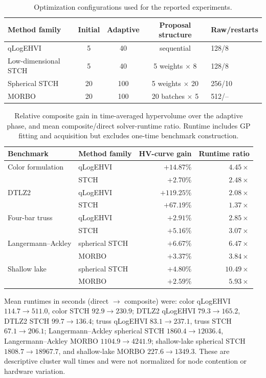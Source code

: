 \documentclass{article}
\begin{document}
\begin{table}[ht]
\centering
\caption{Optimization configurations used for the reported experiments.}
\label{tab:optimization-config}
\footnotesize
\setlength{\tabcolsep}{4pt}
\begin{tabular}{lcccl}
\toprule
Method family & Initial & Adaptive & Proposal structure & Raw/restarts \\
\midrule
qLogEHVI & 5 & 40 & sequential & 128/8 \\
Low-dimensional STCH & 5 & 40 & 5 weights $\times$ 8 & 128/8 \\
Spherical STCH & 20 & 100 & 5 weights $\times$ 20 & 256/10 \\
MORBO & 20 & 100 & 20 batches $\times$ 5 & 512/-- \\
\bottomrule
\end{tabular}
\end{table}

\begin{table}[ht]
\centering
\caption{Relative composite gain in time-averaged hypervolume over the adaptive
phase, and mean composite/direct solver-runtime ratio.  Runtime includes GP
fitting and acquisition but excludes one-time benchmark construction.}
\small
\setlength{\tabcolsep}{5pt}
\begin{tabular}{llrr}
\toprule
Benchmark & Method family & HV-curve gain & Runtime ratio \\
\midrule
Color formulation & qLogEHVI & $+14.87\%$ & $4.45\times$ \\
 & STCH & $+2.70\%$ & $2.48\times$ \\
DTLZ2 & qLogEHVI & $+119.25\%$ & $2.08\times$ \\
 & STCH & $+67.19\%$ & $1.37\times$ \\
Four-bar truss & qLogEHVI & $+2.91\%$ & $2.85\times$ \\
 & STCH & $+5.16\%$ & $3.07\times$ \\
Langermann--Ackley & spherical STCH & $+6.67\%$ & $6.47\times$ \\
 & MORBO & $+3.37\%$ & $3.84\times$ \\
Shallow lake & spherical STCH & $+4.80\%$ & $10.49\times$ \\
 & MORBO & $+2.59\%$ & $5.93\times$ \\
\bottomrule
\end{tabular}
\end{table}

Mean runtimes in seconds (direct $\rightarrow$ composite) were:
color qLogEHVI $114.7\rightarrow511.0$, color STCH
$92.9\rightarrow230.9$; DTLZ2 qLogEHVI $79.3\rightarrow165.2$, DTLZ2 STCH
$99.7\rightarrow136.4$; truss qLogEHVI $83.1\rightarrow237.1$, truss STCH
$67.1\rightarrow206.1$; Langermann--Ackley spherical STCH
$1860.4\rightarrow12036.4$, Langermann--Ackley MORBO
$1104.9\rightarrow4241.9$; shallow-lake spherical STCH
$1808.7\rightarrow18967.7$, and shallow-lake MORBO
$227.6\rightarrow1349.3$.  These are descriptive cluster wall times and were
not normalized for node contention or hardware variation.
\end{document}
